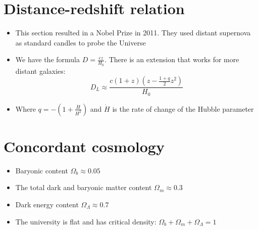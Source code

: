 \documentclass{article}
\begin{document}
\section{Distance-redshift relation}
\begin{itemize}
\item This section resulted in a Nobel Prize in 2011. They used distant supernova as standard candles to probe the Universe
\item We have the formula $D=\frac{cz}{H_0}$. There is an extension that works for more distant galaxies:
\begin{equation}
D_L \approx \frac{c(1+z)(z-\frac{1+q}{2}z^2)}{H_0}
\end{equation}
\item Where $q=-\left(1+\frac{\dot{H}}{H^2}\right)$ and $\dot{H}$ is the rate of change of the Hubble parameter
\end{itemize}
\section{Concordant cosmology}
\begin{itemize}
\item Baryonic content  $\Omega_b \approx 0.05$
\item The total dark and baryonic matter content $\Omega_m \approx 0.3$
\item Dark energy content $\Omega_\Lambda \approx 0.7$
\item The university is flat and has critical density:  $\Omega_b+\Omega_m+\Omega_\Lambda=1$
\end{itemize}
\end{document}
